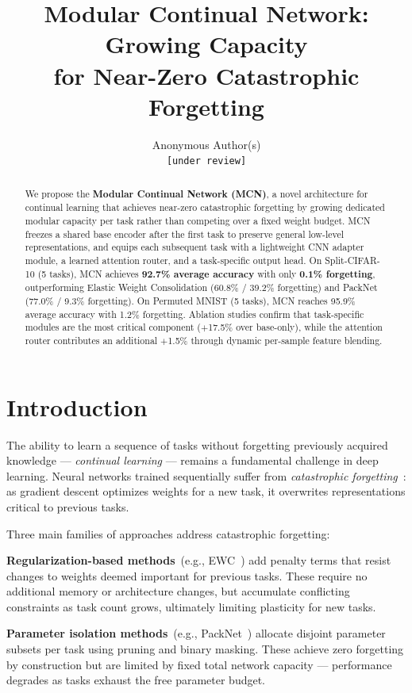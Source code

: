\documentclass[10pt,twocolumn]{article}
\title{\textbf{Modular Continual Network: Growing Capacity\\for Near-Zero Catastrophic Forgetting}}
\author{
  Anonymous Author(s)\\
  \texttt{[under review]}
}
\date{}
\begin{document}
\maketitle

\begin{abstract}
We propose the \textbf{Modular Continual Network (MCN)}, a novel architecture for continual learning that achieves near-zero catastrophic forgetting by growing dedicated modular capacity per task rather than competing over a fixed weight budget. MCN freezes a shared base encoder after the first task to preserve general low-level representations, and equips each subsequent task with a lightweight CNN adapter module, a learned attention router, and a task-specific output head. On Split-CIFAR-10 (5 tasks), MCN achieves \textbf{92.7\% average accuracy} with only \textbf{0.1\% forgetting}, outperforming Elastic Weight Consolidation (60.8\% / 39.2\% forgetting) and PackNet (77.0\% / 9.3\% forgetting). On Permuted MNIST (5 tasks), MCN reaches 95.9\% average accuracy with 1.2\% forgetting. Ablation studies confirm that task-specific modules are the most critical component ($+$17.5\% over base-only), while the attention router contributes an additional $+$1.5\% through dynamic per-sample feature blending.
\end{abstract}

\section{Introduction}

The ability to learn a sequence of tasks without forgetting previously acquired knowledge --- \emph{continual learning} --- remains a fundamental challenge in deep learning. Neural networks trained sequentially suffer from \emph{catastrophic forgetting}~\cite{mccloskey1989}: as gradient descent optimizes weights for a new task, it overwrites representations critical to previous tasks.

Three main families of approaches address catastrophic forgetting:

\textbf{Regularization-based methods}~(e.g., EWC~\cite{ewc2017}) add penalty terms that resist changes to weights deemed important for previous tasks. These require no additional memory or architecture changes, but accumulate conflicting constraints as task count grows, ultimately limiting plasticity for new tasks.

\textbf{Parameter isolation methods}~(e.g., PackNet~\cite{packnet2018}) allocate disjoint parameter subsets per task using pruning and binary masking. These achieve zero forgetting by construction but are limited by fixed total network capacity --- performance degrades as tasks exhaust the free parameter budget.
\end{document}
